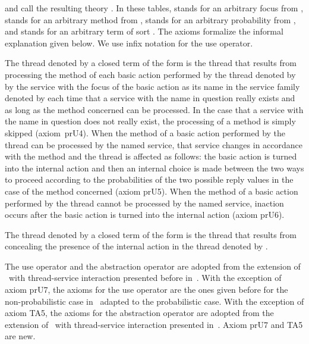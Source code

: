 \documentclass{llncs}
\begin{document}
and call the resulting theory \prTSI.
In these tables,  stands for an arbitrary focus from ,  
stands for an arbitrary method from ,  stands for an 
arbitrary probability from , and  stands for an arbitrary term 
of sort .
The axioms formalize the informal explanation given below.
We use infix notation for the use operator.

The thread denoted by a closed term of the form  is the 
thread that results from processing the method of each basic action 
performed by the thread denoted by  by the service with the focus of 
the basic action as its name in the service family denoted by   
each time that a service with the name in question really exists and as
long as the method concerned can be processed.
In the case that a service with the name in question does not really 
exist, the processing of a method is simply skipped (axiom~prU4).
When the method of a basic action performed by the thread can be 
processed by the named service, that service changes in accordance with 
the method and the thread is affected as follows: the basic action is 
turned into the internal action  and then an internal choice is 
made between the two ways to proceed according to the probabilities of 
the two possible reply values in the case of the method concerned 
(axiom prU5).
When the method of a basic action performed by the thread cannot be
processed by the named service, inaction occurs after the basic action 
is turned into the internal action  (axiom prU6).

The thread denoted by a closed term of the form  is
the thread that results from concealing the presence of the internal 
action  in the thread denoted by .

The use operator and the abstraction operator are adopted from the 
extension of \BTA\ with thread-service interaction presented before
in~\cite{BM12b}.
With the exception of axiom prU7, the axioms for the use operator are 
the ones given before for the non-probabilistic case in~\cite{BM12b} 
adapted to the probabilistic case.
With the exception of axiom TA5, the axioms for the abstraction operator 
are adopted from the extension of \BTA\ with thread-service interaction 
presented in~\cite{BM12b}.
Axiom prU7 and TA5 are new.
\end{document}
